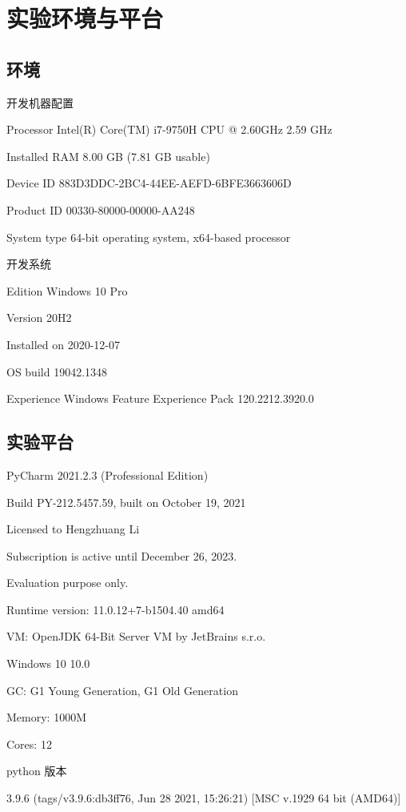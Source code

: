 
\section{实验环境与平台}
\subsection{环境}

开发机器配置

Processor	Intel(R) Core(TM) i7-9750H CPU @ 2.60GHz   2.59 GHz

Installed RAM	8.00 GB (7.81 GB usable)

Device ID	883D3DDC-2BC4-44EE-AEFD-6BFE3663606D

Product ID	00330-80000-00000-AA248

System type	64-bit operating system, x64-based processor

开发系统

Edition	Windows 10 Pro

Version	20H2

Installed on	‎2020-‎12-‎07

OS build	19042.1348

Experience	Windows Feature Experience Pack 120.2212.3920.0

\subsection{实验平台}

PyCharm 2021.2.3 (Professional Edition)

Build PY-212.5457.59, built on October 19, 2021

Licensed to Hengzhuang Li

Subscription is active until December 26, 2023.

Evaluation purpose only.

Runtime version: 11.0.12+7-b1504.40 amd64

VM: OpenJDK 64-Bit Server VM by JetBrains s.r.o.

Windows 10 10.0

GC: G1 Young Generation, G1 Old Generation

Memory: 1000M

Cores: 12

python 版本

3.9.6 (tags/v3.9.6:db3ff76, Jun 28 2021, 15:26:21) [MSC v.1929 64 bit (AMD64)]

